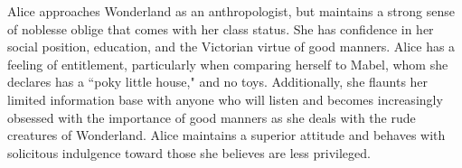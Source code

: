 \documentclass[letterpaper]{twentysecondcv} %
\begin{document}




Alice approaches Wonderland as an anthropologist, but maintains a strong sense of noblesse oblige that comes with her class status. She has confidence in her social position, education, and the Victorian virtue of good manners. Alice has a feeling of entitlement, particularly when comparing herself to Mabel, whom she declares has a ``poky little house," and no toys. Additionally, she flaunts her limited information base with anyone who will listen and becomes increasingly obsessed with the importance of good manners as she deals with the rude creatures of Wonderland. Alice maintains a superior attitude and behaves with solicitous indulgence toward those she believes are less privileged.




\end{document}
